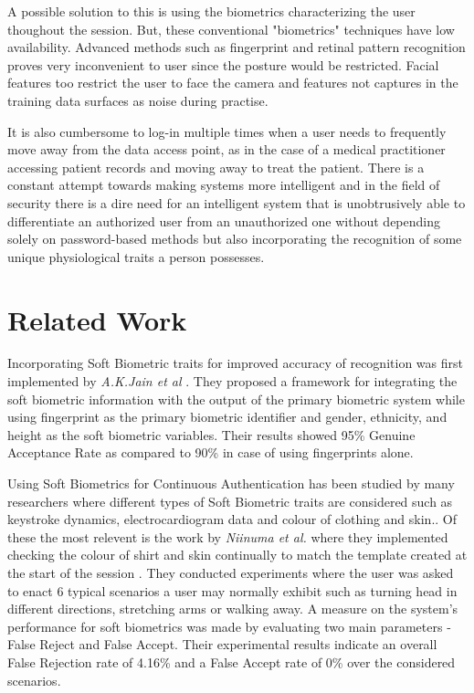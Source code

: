 \documentclass[%
        final,
        internal,
        notitlepage,
        narroweqnarray,
        inline,
        ]{ieee}
\begin{document}
A possible solution to this is using the biometrics characterizing the user thoughout the session.
But, these conventional "biometrics" techniques have low availability. 
Advanced methods such as fingerprint and retinal pattern recognition proves very inconvenient to user since the posture would be restricted.
Facial features too restrict the user to face the camera and features not captures in the training data surfaces as noise during practise.

It is also cumbersome to log-in multiple times when a user needs to frequently move away from the data access point, as in the case of a medical practitioner accessing patient records and moving away to treat the patient.
There is a constant attempt towards making systems more intelligent and in the field of security there is a dire need for an intelligent system that is unobtrusively able to differentiate an authorized user from an unauthorized one without depending solely on password-based methods but also incorporating the recognition of some unique physiological traits a person possesses.


\section{Related Work} \label{sec:related}
Incorporating Soft Biometric traits for improved accuracy of recognition was first implemented by \emph{A.K.Jain et al} \cite{Jain204}.
They proposed a framework for integrating the soft biometric information with the output of the primary biometric system while using fingerprint as the primary biometric identifier and gender, ethnicity, and height as the soft biometric variables.
Their results showed 95\% Genuine Acceptance Rate as compared to 90\% in case of using fingerprints alone. 

Using Soft Biometrics for Continuous Authentication has been studied by many researchers where different types of Soft Biometric traits are considered such as keystroke dynamics, electrocardiogram data and colour of clothing and skin.\cite{mon00,ecd,Niin10}.
Of these the most relevent is the work by \emph{Niinuma et al.} where they implemented checking the colour of shirt and skin continually to match the template created at the start of the session \cite{Niin10}.
They conducted experiments where the user was asked to enact 6 typical scenarios a user may normally exhibit such as turning head in different directions, stretching arms or walking away.
A measure on the system's performance for soft biometrics was made by evaluating two main parameters - False Reject and False Accept.
Their experimental results indicate an overall False Rejection rate of 4.16\% and a False Accept rate of 0\% over the considered scenarios.
\end{document}
